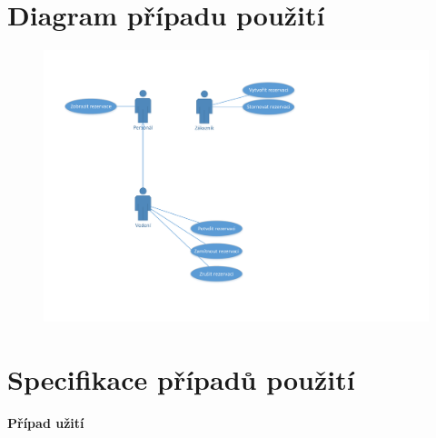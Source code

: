 \documentclass[a4paper,10pt]{article}
\begin{document}
\section*{Diagram případu použití}
\begin{figure}[h!]
\begin{center}
\includegraphics[scale=0.75]{resources/iteration01.pdf}
\label{fig:iteration01}
\end{center}
\end{figure}

\newpage
\section*{Specifikace případů použití}
\textbf{Případ užití }
\end{document}
